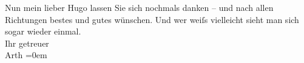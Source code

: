 \pstart
           Nun mein lieber Hugo lassen Sie sich nochmals danken – und nach allen Richtungen
               bestes und gutes wünschen. Und wer weiſs vielleicht sieht man sich sogar wieder
               einmal.{\\[\baselineskip]}Ihr getreuer{\\[\baselineskip]}\spacefill\mbox{Arth}\pend
           \leftskip=0em{}\endnumbering{}  \newcommand{\dateiname}{L02504}\newcommand{\titel}{Arthur Schnitzler an Hugo Hofmannsthal, 21. 7. 1928}\newcommand{\editorInnen}{Martin Anton Müller und Gerd-Hermann Susen}
